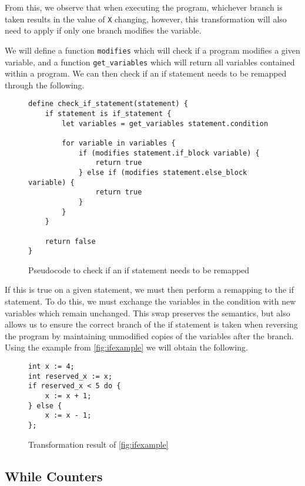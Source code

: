 From this, we observe that when executing the program, whichever branch is taken results in the value of \lstinline{X} changing, however, this transformation will also need to apply if only one branch modifies the variable.

We will define a function \lstinline{modifies} which will check if a \rimplang program modifies a given variable, and a function \lstinline{get_variables} which will return all variables contained within a \rimplang program.
We can then check if an if statement needs to be remapped through the following.

\begin{figure}[ht]
    \centering
    \begin{lstlisting}[label={lst:ifcheckpseudo}, basicstyle=\small]
define check_if_statement(statement) {
    if statement is if_statement {
        let variables = get_variables statement.condition

        for variable in variables {
            if (modifies statement.if_block variable) {
                return true
            } else if (modifies statement.else_block variable) {
                return true
            }
        }
    }

    return false
}
    \end{lstlisting}
    \caption{Pseudocode to check if an if statement needs to be remapped}
    \label{fig:ifcheckpseudo}
\end{figure}

If this is true on a given statement, we must then perform a remapping to the if statement. To do this, we must exchange the variables in the condition with new variables which remain unchanged. This swap preserves the semantics, but also allows us to ensure the correct branch of the if statement is taken when reversing the program by maintaining unmodified copies of the variables after the branch.
Using the example from \ref{fig:ifexample} we will obtain the following.

\begin{figure}[hbt!]
    \centering
    \begin{lstlisting}[label={lst:ifexamplemodified}, basicstyle=\small]
int x := 4;
int reserved_x := x;
if reserved_x < 5 do {
    x := x + 1;
} else {
    x := x - 1;
};
    \end{lstlisting}
    \caption{Transformation result of \ref{fig:ifexample}}
    \label{fig:ifexamplemodified}
\end{figure}

\subsection{While Counters}

